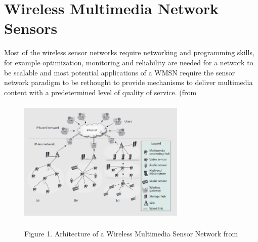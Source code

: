 \documentclass[conference]{IEEEtran}
\begin{document}
\section{Wireless Multimedia Network Sensors}

Most of the wireless sensor networks require networking and programming skills, for example optimization, monitoring and reliability are needed for a network to be scalable and most potential applications of a WMSN require the sensor network paradigm to be rethought to provide mechanisms to deliver multimedia content with a predetermined level of quality of service. (from \citet{Ianf03}
\begin{figure}
    \includegraphics[width=8cm, height=6cm]{images/p1.png}
    \centering
    \caption{Figure 1. Arhitecture of a Wireless Multimedia Sensor Network from} \citet{Hamd01}
\end{figure}
\end{document}
